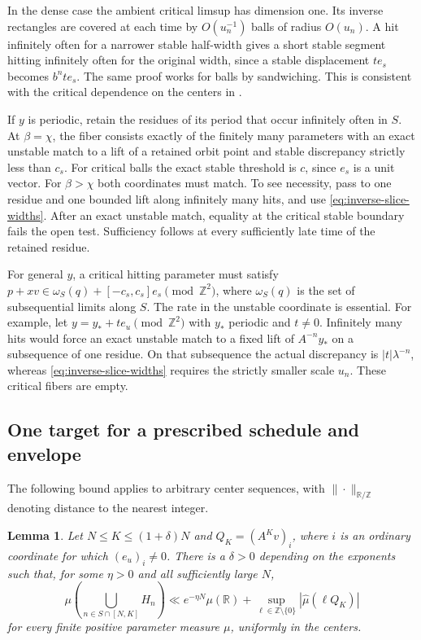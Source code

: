 \documentclass[11pt,a4paper,reqno]{amsart}
\newtheorem{lemma}[theorem]{Lemma}
\theoremstyle{definition}
\theoremstyle{remark}
\numberwithin{equation}{section}
\begin{document}
In the dense case the ambient critical limsup has dimension one.
Its inverse rectangles are covered at each time by \(O(u_n^{-1})\)
balls of radius \(O(u_n)\). A hit infinitely often for a narrower
stable half-width gives a short stable segment hitting infinitely
often for the original width, since a stable displacement \(t e_s\)
becomes \(b^n t e_s\). The same proof works for balls by sandwiching.
This is consistent with the critical dependence on the centers in
\cite[Remark~2.2]{HPWZ}.

If \(y\) is periodic, retain the residues of
its period that occur infinitely often in \(S\). At \(\beta=\chi\),
the fiber consists exactly of the finitely many parameters with an
exact unstable match to a lift of a retained orbit point and stable
discrepancy strictly less than \(c_s\). For critical balls the exact
stable threshold is \(c\), since \(e_s\) is a unit vector. For
\(\beta>\chi\) both coordinates must match. To see necessity, pass
to one residue and one bounded lift along infinitely many hits, and
use \eqref{eq:inverse-slice-widths}. After an exact unstable match,
equality at the critical stable boundary fails the open test.
Sufficiency follows at every sufficiently late time of the retained
residue.

For general \(y\), a critical hitting parameter must satisfy
\(p+xv\in\omega_S(q)+[-c_s,c_s]e_s\pmod{\mathbb Z^2}\), where
\(\omega_S(q)\) is the set of subsequential limits along \(S\).
The rate in the unstable coordinate is essential. For example, let
\(y=y_*+t e_u\pmod{\mathbb Z^2}\) with \(y_*\) periodic and \(t\ne0\).
Infinitely many hits would force an exact unstable match to a fixed
lift of \(A^{-n}y_*\) on a subsequence of one residue. On that
subsequence the actual discrepancy is \(|t|\lambda^{-n}\),
whereas \eqref{eq:inverse-slice-widths} requires the strictly smaller
scale \(u_n\). These critical fibers are empty.

\subsection{One target for a prescribed schedule and envelope}

The following bound applies to arbitrary center sequences, with
\(\|\cdot\|_{\mathbb R/\mathbb Z}\) denoting distance to the nearest
integer.

\begin{lemma}\label{lem:parameter-block}
Let \(N\le K\le(1+\delta)N\) and
\(Q_K=(A^Kv)_i\), where \(i\) is an ordinary coordinate for which
\((e_u)_i\ne0\). There is a \(\delta>0\) depending on the exponents
such that, for some \(\eta>0\) and all sufficiently large \(N\),
\[
 \mu\left(\bigcup_{n\in S\cap[N,K]}H_n\right)
 \ll e^{-\eta N}\mu(\mathbb R)
      +\sup_{\ell\in\mathbb Z\setminus\{0\}}
             |\widehat\mu(\ell Q_K)|
\]
for every finite positive parameter measure \(\mu\), uniformly in
the centers.
\end{lemma}
\end{document}
